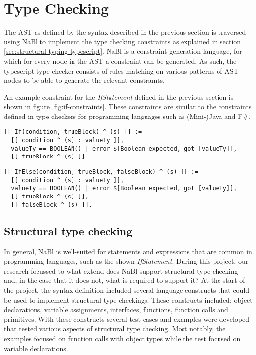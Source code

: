 \section{Type Checking}
\label{sec:type-checking}

The AST as defined by the syntax described in the previous section is traversed using NaBl \citep{Antwerpen:2016:CLS:2847538.2847543} to implement the type checking constraints as explained in section \ref{sec:structural-typing-typescript}.
NaBl is a constraint generation language, for which for every node in the AST a constraint can be generated.
As such, the typescript type checker consists of rules matching on various patterns of AST nodes to be able to generate the relevant constraints.

An example constraint for the \textit{IfStatement} defined in the previous section is shown in figure \ref{fig:if-constraints}.
These constraints are similar to the constraints defined in type checkers for programming languages such as (Mini-)Java and F\#.

\begin{figure*}
  \begin{lstlisting}[caption=Constraint generation for an \textit{If} AST node (representing an \textit{IfStatement})]
[[ If(condition, trueBlock) ^ (s) ]] :=
  [[ condition ^ (s) : valueTy ]],
  valueTy == BOOLEAN() | error $[Boolean expected, got [valueTy]],
  [[ trueBlock ^ (s) ]].
  \end{lstlisting}
  \begin{lstlisting}[caption=Constraint generation for an \textit{IfElse} AST node (representing an \textit{IfStatement})]
[[ IfElse(condition, trueBlock, falseBlock) ^ (s) ]] :=
  [[ condition ^ (s) : valueTy ]],
  valueTy == BOOLEAN() | error $[Boolean expected, got [valueTy]],
  [[ trueBlock ^ (s) ]],
  [[ falseBlock ^ (s) ]].
  \end{lstlisting}
  \caption{The constraints for the two forms of an \textit{IfStatement}.}
  \label{fig:if-constraints}
\end{figure*}

\subsection{Structural type checking}

In general, NaBl is well-suited for statements and expressions that are common in programming languages, such as the shown \textit{IfStatement}.
During this project, our research focussed to what extend does NaBl support structural type checking and, in the case that it does not, what is required to support it?
At the start of the project, the syntax definition included several language constructs that could be used to implement structural type checkings.
These constructs included: object declarations, variable assignments, interfaces, functions, function calls and primitives.
With these constructs several test cases and examples were developed that tested various aspects of structural type checking.
Most notably, the examples focused on function calls with object types while the test focused on variable declarations.

